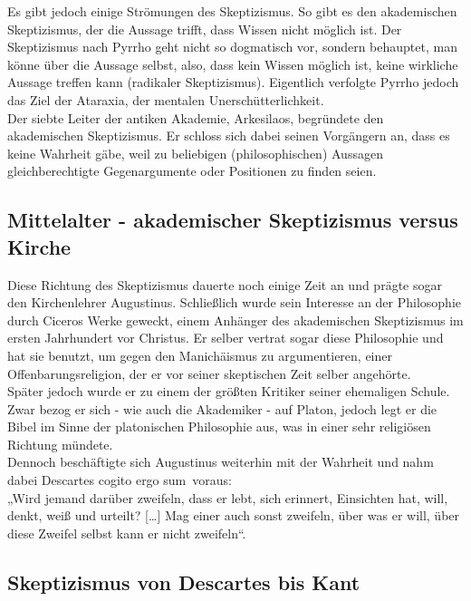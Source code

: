 \documentclass[11pt,a4paper]{article}
\begin{document}
Es gibt jedoch einige Strömungen des Skeptizismus. So gibt es den akademischen Skeptizismus, der die Aussage trifft, dass Wissen nicht möglich ist. Der Skeptizismus nach Pyrrho geht nicht so dogmatisch vor, sondern behauptet, man könne über die Aussage selbst, also, dass kein Wissen möglich ist, keine wirkliche Aussage treffen kann (radikaler Skeptizismus).%
Eigentlich verfolgte Pyrrho jedoch das Ziel der Ataraxia, der mentalen Unerschütterlichkeit.\\

Der siebte Leiter der antiken Akademie, Arkesilaos, begründete den akademischen Skeptizismus. Er schloss sich dabei seinen Vorgängern an, dass es keine Wahrheit gäbe, weil zu beliebigen (philosophischen) Aussagen gleichberechtigte Gegenargumente oder Positionen zu finden seien.
	\subsection{Mittelalter - akademischer Skeptizismus versus Kirche}
Diese Richtung des Skeptizismus dauerte noch einige Zeit an und prägte sogar den Kirchenlehrer Augustinus. Schließlich wurde sein Interesse an der Philosophie durch Ciceros Werke geweckt, einem Anhänger des akademischen Skeptizismus im ersten Jahrhundert vor Christus. Er selber vertrat sogar diese Philosophie und hat sie benutzt, um gegen den Manichäismus zu argumentieren, einer Offenbarungsreligion, der er vor seiner skeptischen Zeit selber angehörte.\\%
Später jedoch wurde er zu einem der größten Kritiker seiner ehemaligen Schule. Zwar bezog er sich - wie auch die Akademiker - auf Platon, jedoch legt er die Bibel im Sinne der platonischen Philosophie aus, was in einer sehr religiösen Richtung mündete.\\%
Dennoch beschäftigte sich Augustinus weiterhin mit der Wahrheit und nahm dabei Descartes \glqq cogito ergo sum\grqq\ voraus:\\
„Wird jemand darüber zweifeln, dass er lebt, sich erinnert, Einsichten hat, will, denkt, weiß und urteilt? […] Mag einer auch sonst zweifeln, über was er will, über diese Zweifel selbst kann er nicht zweifeln“.
	\subsection{Skeptizismus von Descartes bis Kant}
\end{document}

